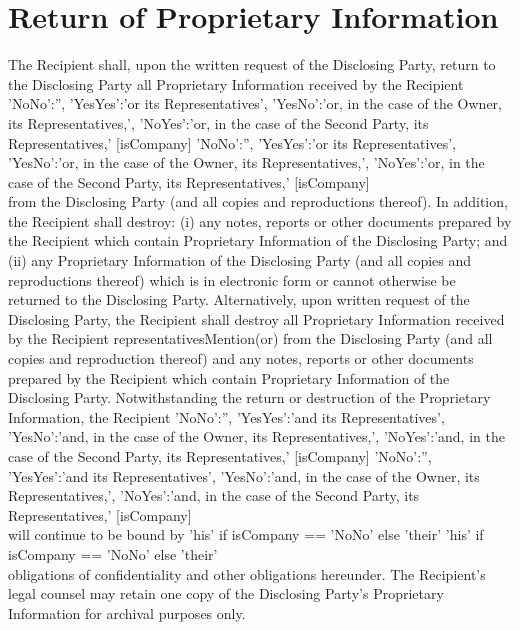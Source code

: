 \documentclass[10pt]{article}
\makeatletter
\edef\history{ }
\newcommand{\VAR}[1]{{\color{blue} #1}\g@addto@macro\history{#1\\}}
\newcommand{\representativesMention}[1]{
    \VAR{
        {
            'NoNo':'',
            'YesYes':'#1 its Representatives',
            'YesNo':'#1, in the case of the Owner, its Representatives,',
            'NoYes':'#1, in the case of the Second Party, its Representatives,'
        }[isCompany]
    }
}
\makeatother
\begin{document}
\section{Return of Proprietary Information}
The Recipient shall, upon the written request of the Disclosing Party, return to the Disclosing Party all Proprietary Information received by the Recipient \representativesMention{or} from the Disclosing Party (and all copies and reproductions thereof). In addition, the Recipient shall destroy:  (i) any notes, reports or other documents prepared by the Recipient which contain Proprietary Information of the Disclosing Party; and (ii) any Proprietary Information of the Disclosing Party (and all copies and reproductions thereof) which is in electronic form or cannot otherwise be returned to the Disclosing Party. Alternatively, upon written request of the Disclosing Party, the Recipient shall destroy all Proprietary Information received by the Recipient {representativesMention}(or) from the Disclosing Party (and all copies and reproduction thereof) and any notes, reports or other documents prepared by the Recipient which contain Proprietary Information of the Disclosing Party. Notwithstanding the return or destruction of the Proprietary
Information, the Recipient \representativesMention{and} will continue to be bound by
\VAR{  'his'  if isCompany == 'NoNo' else 'their' }
obligations  of confidentiality and other obligations hereunder.
The Recipient's legal counsel may retain one copy of the Disclosing Party's Proprietary Information for archival purposes only.
\end{document}
